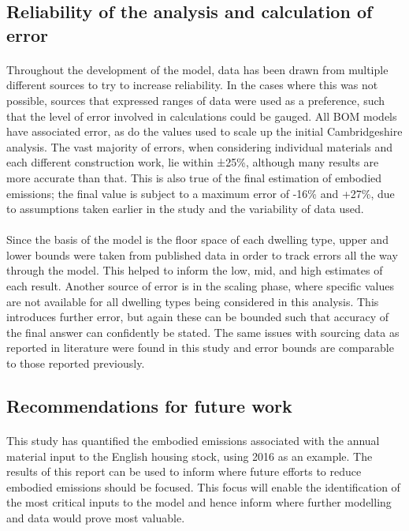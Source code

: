 \documentclass[12pt]{article}
\begin{document}
\subsection{Reliability of the analysis and calculation of error}

\paragraph{}
Throughout the development of the model, data has been drawn from multiple different sources to try to increase reliability. In the cases where this was not possible, sources that expressed ranges of data were used as a preference, such that the level of error involved in calculations could be gauged. All BOM models have associated error, as do the values used to scale up the initial Cambridgeshire analysis. The vast majority of errors, when considering individual materials and each different construction work, lie within ±25\%, although many results are more accurate than that. This is also true of the final estimation of embodied emissions; the final value is subject to a maximum error of -16\% and +27\%, due to assumptions taken earlier in the study and the variability of data used.

\paragraph{}
Since the basis of the model is the floor space of each dwelling type, upper and lower bounds were taken from published data in order to track errors all the way through the model. This helped to inform the low, mid, and high estimates of each result. Another source of error is in the scaling phase, where specific values are not available for all dwelling types being considered in this analysis. This introduces further error, but again these can be bounded such that accuracy of the final answer can confidently be stated. The same issues with sourcing data as reported in literature were found in this study and error bounds are comparable to those reported previously.

\subsection{Recommendations for future work}

\paragraph{}
This study has quantified the embodied emissions associated with the annual material input to the English housing stock, using 2016 as an example. The results of this report can be used to inform where future efforts to reduce embodied emissions should be focused. This focus will enable the identification of the most critical inputs to the model and hence inform where further modelling and data would prove most valuable. 
\end{document}
